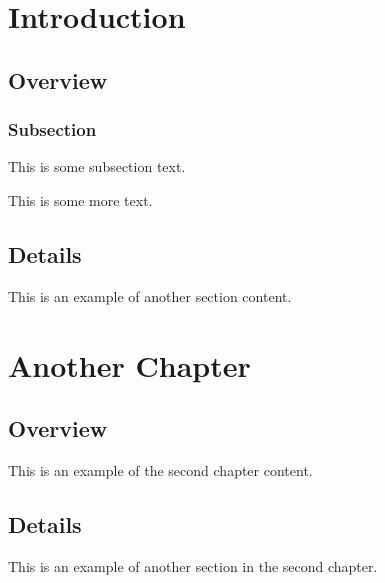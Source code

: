 \documentclass[openany, 11pt]{book}
\begin{document}
\chapter{Introduction}
\section{Overview}
\subsection{Subsection}
This is some subsection text.

\newpage

This is some more text.

\section{Details}
This is an example of another section content.

\chapter{Another Chapter}
\section{Overview}
This is an example of the second chapter content.

\section{Details}
This is an example of another section in the second chapter.
\end{document}
